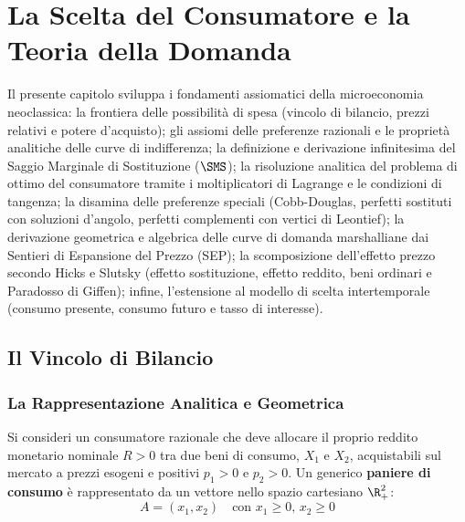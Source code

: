 \chapter{La Scelta del Consumatore e la Teoria della Domanda}
\label{chap:scelta_consumatore_domanda}

\begin{tcolorbox}[colback=navyblue!5!white, colframe=navyblue, title=\textbf{Quadro Concettuale e Obiettivi Didattici}]
Il presente capitolo sviluppa i fondamenti assiomatici della microeconomia neoclassica: la frontiera delle possibilità di spesa (vincolo di bilancio, prezzi relativi e potere d'acquisto); gli assiomi delle preferenze razionali e le proprietà analitiche delle curve di indifferenza; la definizione e derivazione infinitesima del Saggio Marginale di Sostituzione ($\SMS$); la risoluzione analitica del problema di ottimo del consumatore tramite i moltiplicatori di Lagrange e le condizioni di tangenza; la disamina delle preferenze speciali (Cobb-Douglas, perfetti sostituti con soluzioni d'angolo, perfetti complementi con vertici di Leontief); la derivazione geometrica e algebrica delle curve di domanda marshalliane dai Sentieri di Espansione del Prezzo (SEP); la scomposizione dell'effetto prezzo secondo Hicks e Slutsky (effetto sostituzione, effetto reddito, beni ordinari e Paradosso di Giffen); infine, l'estensione al modello di scelta intertemporale (consumo presente, consumo futuro e tasso di interesse).
\end{tcolorbox}

\section{Il Vincolo di Bilancio}

\subsection{La Rappresentazione Analitica e Geometrica}
Si consideri un consumatore razionale che deve allocare il proprio reddito monetario nominale $R > 0$ tra due beni di consumo, $X_1$ e $X_2$, acquistabili sul mercato a prezzi esogeni e positivi $p_1 > 0$ e $p_2 > 0$.
Un generico \textbf{paniere di consumo} è rappresentato da un vettore nello spazio cartesiano $\R_+^2$:
\begin{equation}
    A = (x_1, x_2) \quad \text{con } x_1 \ge 0, \, x_2 \ge 0
\end{equation}

